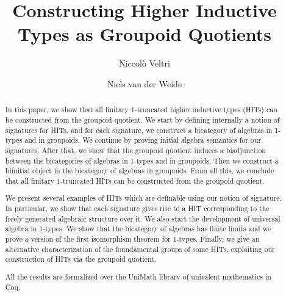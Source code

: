 \documentclass{lmcs}
\theoremstyle{plain}
\theoremstyle{definition}
\begin{document}
	
\lstset{language=Coq}

\title{Constructing Higher Inductive Types as Groupoid Quotients}


\author{Niccol{\`o} Veltri}
\address{Tallinn University of Technology, Estonia}

\author{Niels van der Weide}
\address{Radboud University, Nijmegen, The Netherlands}

\begin{abstract}
	In this paper, we show that all finitary 1-truncated higher inductive types (HITs) can be constructed from the groupoid quotient.
	We start by defining internally a notion of signatures for HITs,
	and for each signature, we construct a bicategory of algebras in 1-types and in groupoids.
	We continue by proving initial algebra semantics for our signatures.
	After that, we show that the groupoid quotient induces a biadjunction between the bicategories of algebras in 1-types and in groupoids.
	Then we construct a biinitial object in the bicategory of algebras in groupoids.
	From all this, we conclude that all finitary 1-truncated HITs can be constructed from the groupoid quotient.
        
        We present several examples of HITs which are definable using our notion of signature.
        In particular, we show that each signature gives rise to a HIT corresponding to the freely generated algebraic structure over it.
        We also start the development of universal algebra in 1-types.
        We show that the bicategory of algebras has finite limits and we prove a version of the first isomorphism theorem for 1-types.
        Finally, we give an alternative characterization of the foundamental groups of some HITs, exploiting our construction of HITs via the groupoid quotient.
        
	All the results are formalized over the UniMath library of univalent mathematics in Coq.
\end{abstract}
\end{document}
